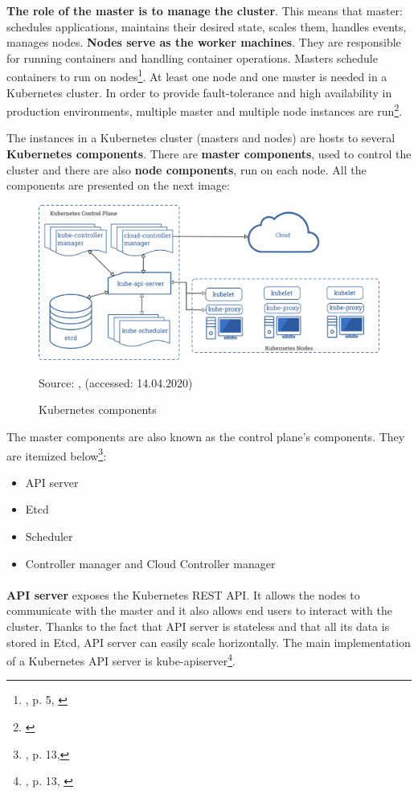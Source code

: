 \textbf{The role of the master is to manage the cluster}. This means that master: schedules applications, maintains their desired state, scales them, handles events, manages nodes. \textbf{Nodes serve as the worker machines}. They are responsible for running containers and handling container operations. Masters schedule containers to run on nodes\footnote{\cite{book-mastering-k8s}, p. 5, \cite{k8s-cluster}}. At least one node and one master is needed in a Kubernetes cluster. In order to provide fault-tolerance and high availability in production environments, multiple master and multiple node instances are run\footnote{\cite{k8s-components}}.

The instances in a Kubernetes cluster (masters and nodes) are hosts to several \textbf{Kubernetes components}. There are \textbf{master components}, used to control the cluster and there are also \textbf{node components}, run on each node. All the components are presented on the next image:
\begin{figure}[H]
    \centering
    \includegraphics[width=14cm]{figures/components-of-kubernetes.png}
    \label{fig:cluster}
    \caption{Kubernetes components}
    \small{Source: \cite{k8s-components}, (accessed: 14.04.2020)}
\end{figure}


The master components are also known as the control plane’s components. They are itemized below\footnote{\cite{book-mastering-k8s}, p. 13,\cite{k8s-components}}:
\begin{itemize}
\item API server
\item Etcd
\item Scheduler
\item Controller manager and Cloud Controller manager
\end{itemize}

\paragraph{}
\textbf{API server} exposes the Kubernetes REST API. It allows the nodes to communicate with the master and it also allows end users to interact with the cluster. Thanks to the fact that API server is stateless and that all its data is stored in Etcd, API server can easily scale horizontally. The main implementation of a Kubernetes API server is kube-apiserver\footnote{\cite{book-mastering-k8s}, p. 13, \cite{k8s-cluster,k8s-components}}.

